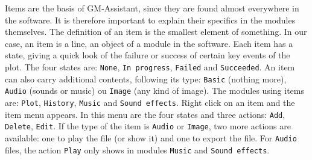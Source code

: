 \documentclass[a4paper,12pt]{article}
\newcommand*{\GMA}{GM-Assistant\xspace}
\newcommand*{\interfaceitem}[1]{\texttt{#1}}
\begin{document}
Items are the basis of \GMA, since they are found almost everywhere in the software. It is therefore important to explain their specifics in the modules themselves.
The definition of an item is the smallest element of something.
In our case, an item is a line, an object of a module in the software.
Each item has a state, giving a quick look of the failure or success of certain key events of the plot.
The four states are: \interfaceitem{None}, \interfaceitem{In progress}, \interfaceitem{Failed} and \interfaceitem{Succeeded}.
An item can also carry additional contents, following its type: \interfaceitem{Basic} (nothing more), \interfaceitem{Audio} (sounds or music) ou \interfaceitem{Image} (any kind of image).
The modules using items are: \interfaceitem{Plot}, \interfaceitem{History}, \interfaceitem{Music} and \interfaceitem{Sound effects}.
Right click on an item and the item menu appears. In this menu are the four states and three actions: \interfaceitem{Add}, \interfaceitem{Delete}, \interfaceitem{Edit}.
If the type of the item is \interfaceitem{Audio} or \interfaceitem{Image}, two more actions are available: one to play the file (or show it) and one to export the file.
For \interfaceitem{Audio} files, the action \interfaceitem{Play} only shows in modules \interfaceitem{Music} and \interfaceitem{Sound effects}.
\end{document}
